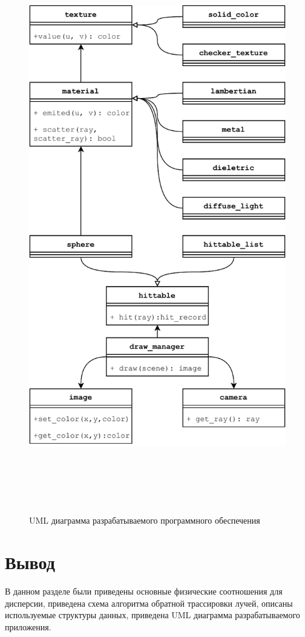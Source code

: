         \begin{figure}
            \centering
            \includegraphics[width=\textwidth,height=25cm,keepaspectratio]{inc/img/uml.pdf}
            \caption{UML диаграмма разрабатываемого программного обеспечения}
            \label{fig:uml}
            \end{figure}

\clearpage

    \section{Вывод}

        В данном разделе были приведены основные физические соотношения для дисперсии, приведена схема алгоритма обратной трассировки лучей, описаны используемые структуры данных, приведена UML диаграмма разрабатываемого приложения.